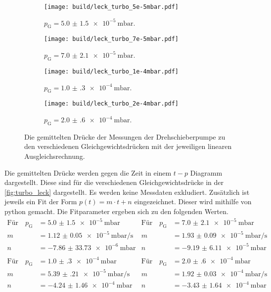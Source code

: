     \begin{figure}[h]
      \begin{subfigure}{0.48\textwidth}
        \centering
        \texttt{[image: build/leck\_turbo\_5e-5mbar.pdf]}
        \caption{$p_\text{G}=\SI{5.0(15)e-5}{\milli\bar}$.}
        \label{fig:turbo_leck_50}
      \end{subfigure}
      \hfill
      \begin{subfigure}{0.48\textwidth}
        \centering
        \texttt{[image: build/leck\_turbo\_7e-5mbar.pdf]}
        \caption{$p_\text{G}=\SI{7.0(21)e-5}{\milli\bar}$.}
        \label{fig:turbo_leck_70}
      \end{subfigure}
      \hfill
      \begin{subfigure}{0.48\textwidth}
        \centering
        \texttt{[image: build/leck\_turbo\_1e-4mbar.pdf]}
        \caption{$p_\text{G}=\SI{1.0(3)e-4}{\milli\bar}$.}
        \label{fig:turbo_leck_100}
      \end{subfigure}
      \hfill
      \begin{subfigure}{0.48\textwidth}
        \centering
        \texttt{[image: build/leck\_turbo\_2e-4mbar.pdf]}
        \caption{$p_\text{G}=\SI{2.0(6)e-4}{\milli\bar}$.}
        \label{fig:turbo_leck_200}
      \end{subfigure}
      \caption{Die gemittelten Drücke der Messungen der Drehschieberpumpe zu den verschiedenen Gleichgewichtsdrücken mit der jeweiligen linearen Ausgleichsrechnung.}
      \label{fig:turbo_leck}
    \end{figure}

    \noindent Die gemittelten Drücke werden gegen die Zeit in einem $t-p$ Diagramm dargestellt. Diese sind für die verschiedenen Gleichgewichtsdrücke in der \autoref{fig:turbo_leck} dargestellt. 
    Es werden keine Messdaten exkludiert.  
    Zusätzlich ist jeweils ein Fit der Form $p(t) = m \cdot t + n $ eingezeichnet. Dieser wird mithilfe von python \cite{scipy} gemacht. Die Fitparameter ergeben sich zu den folgenden Werten. 
    \begin{align*}
      \text{Für} \quad  p_\text{G} &= \SI{5.0(15)e-5}{\milli\bar}   & \text{Für} \quad  p_\text{G} &= \SI{7.0(21)e-5}{\milli\bar}\\
      m &= \SI{1.12(5)e-5}{\milli\bar\per\second}                   & m &= \SI{1.93(9)e-5}{\milli\bar\per\second} \\
      n &= \SI{-7.86(3373)e-6}{\milli\bar}                          & n &= \SI{-9.19(611)e-5}{\milli\bar} \\
      \\  
      \text{Für} \quad  p_\text{G} &= \SI{1.0(3)e-4}{\milli\bar} & \text{Für} \quad  p_\text{G} &= \SI{2.0(6)e-4}{\milli\bar}\\
      m &= \SI{5.39(21)e-5}{\milli\bar\per\second}          & m &= \SI{1.92(3)e-4}{\milli\bar\per\second} \\
      n &= \SI{-4.24(146)e-4}{\milli\bar}                & n &= \SI{-3.43(164)e-4}{\milli\bar} 
    \end{align*} 

